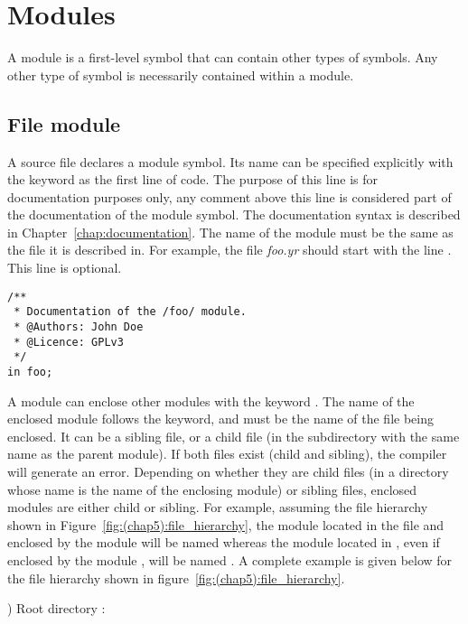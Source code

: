 \section{Modules}%
\label{sec:modules}

A module is a first-level symbol that can contain other types of symbols. Any
other type of symbol is necessarily contained within a module.

\subsection{File module}

A source file declares a module symbol. Its name can be specified explicitly
with the keyword  as the first line of code. The purpose of this line
is for documentation purposes only, any comment above this line is considered
part of the documentation of the module symbol. The documentation syntax is
described in Chapter~\ref{chap:documentation}. The name of the module must
be the same as the file it is described in. For example, the file
\textit{foo.yr} should start with the line . This line is
optional.


\begin{lstlisting}[style=coloredverbatim]
/**
 * Documentation of the /foo/ module.
 * @Authors: John Doe
 * @Licence: GPLv3
 */
in foo;
\end{lstlisting}

A module can enclose other modules with the keyword . The name of
the enclosed module follows the keyword, and must be the name of the file being
enclosed. It can be a sibling file, or a child file (in the subdirectory with
the same name as the parent module). If both files exist (child and sibling),
the compiler will generate an error. Depending on whether they are child files
(in a directory whose name is the name of the enclosing module) or sibling
files, enclosed modules are either child or sibling. For example, assuming the
file hierarchy shown in Figure~\ref{fig:(chap5):file_hierarchy}, the module located in
the file  and enclosed by the module  will
be named  whereas the module located in , even
if enclosed by the module , will be named . A complete
example is given below for the file hierarchy shown in
figure~\ref{fig:(chap5):file_hierarchy}.



) Root directory :

